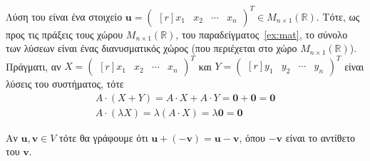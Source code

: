 \begin{examples}
\begin{enumerate}
\begin{equation*}
            \end{equation*} 
            Λύση του είναι ένα στοιχείο $ \mathbf{u} = 
            \begin{pmatrix*}[r]
                x_{1} & x_{2} & \cdots & x_{n} 
            \end{pmatrix*}^{T} \in M_{n \times 1}(\mathbb{R}) $.  Τότε, ως 
            προς τις πράξεις τους χώρου 
            $ M_{n \times 1}(\mathbb{R}) $, του παραδείγματος~\ref{ex:mat}, 
            το σύνολο των λύσεων είναι ένας διανυσματικός χώρος 
            (που περιέχεται στο χώρο $ M_{n \times 1}(\mathbb{R}) $). Πράγματι, 
            αν $ X =\begin{pmatrix*}[r]
                x_{1} & x_{2} & \cdots & x_{n} 
                \end{pmatrix*}^{T} $ και $ Y = \begin{pmatrix*}[r]
                y_{1} & y_{2} & \cdots & y_{n} 
            \end{pmatrix*}^{T} $ είναι λύσεις του συστήματος, τότε
            \begin{gather*}
                A \cdot (X+Y) = A \cdot X + A \cdot Y = \mathbf{0}+ \mathbf{0} = 
                \mathbf{0} \\
                A \cdot (\lambda X) = \lambda (A \cdot X) = \lambda \mathbf{0} = 
                \mathbf{0}
            \end{gather*} 
    \end{enumerate}
\end{examples}

\begin{rem}
\item {}
    Αν $ \mathbf{u}, \mathbf{v} \in V $ τότε θα γράφουμε ότι 
    $ \mathbf{u} + (- \mathbf{v}) = \mathbf{u} - \mathbf{v} $, 
    όπου $ - \mathbf{v} $ είναι το αντίθετο του $ \mathbf{v} $.
\end{rem}


